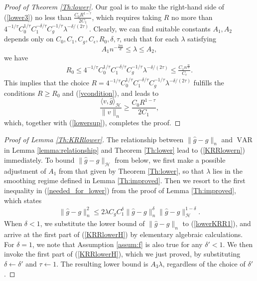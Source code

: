 \documentclass[12pt]{article}
\theoremstyle{plain}
\theoremstyle{remark}
\begin{document}
\begin{proof}[Proof of Theorem \ref{Th:lower}]
    Our goal is to make the right-hand side of (\ref{lower3}) no less than $\frac{C_0R^{1-\tau}}{2C_1}$, which requires taking $R$ no more than $4^{-1/\tau}C_0^{1/\tau}C_1^{-\delta/\tau}C_g^{-1/\tau}\lambda^{-\delta/(2\tau)}$. Clearly, we can find suitable constants $A_1,A_2$ depends only on $C_0,C_1,C_g,C_\epsilon,R_0,\delta,\tau$, such that for each $\lambda$ satisfying
    \[A_1 n^{-\frac{2m}{d}}\leq \lambda\leq A_2,\]
    we have
    \begin{eqnarray}\label{R0}
        R_0\leq 4^{-1/\tau}C_0^{1/\tau}C_1^{-\delta/\tau}C_g^{-1/\tau}\lambda^{-\delta/(2\tau)}\leq \frac{C_1n^{\frac{m}{d}}}{C_\epsilon}.
    \end{eqnarray}
    This implies that the choice $R=4^{-1/\tau}C_0^{1/\tau}C_1^{-\delta/\tau}C_g^{-1/\tau}\lambda^{-\delta/(2\tau)}$ fulfills the conditions $R\geq R_0$ and (\ref{vcondition}), and leads to
    \[\frac{\langle v,\hat{g}\rangle_\mathcal{H}}{\|v\|_n}\geq \frac{C_0 R^{1-\tau}}{2C_1},\]
    which, together with (\ref{lowersup}), completes the proof.
\end{proof}

 \begin{proof}[Proof of Lemma \ref{Th:KRRlower}]
        The relationship between $\|\hat{g}-g\|_n$ and $\operatorname{VAR}$ in Lemma \ref{lemma:relationship} and Theorem \ref{Th:lower} lead to (\ref{KRRlowern}) immediately. To bound $\|\hat{g}-g\|_\mathcal{H}$ from below, we first make a possible adjustment of $A_1$ from that given by Theorem \ref{Th:lower}, so that $\lambda$ lies in the smoothing regime defined in Lemma \ref{Th:improved}. Then we resort to the first inequality in (\ref{needed_for_lower}) from the proof of Lemma \ref{Th:improved}, which states
        \begin{eqnarray}\label{lowerKRR1}
            \|\hat{g}-g\|_n^2\leq 2 \lambda C_gC_1^\delta\|\hat{g}-g\|^{\delta}_n\|\hat{g}-g\|_{\mathcal{H}}^{1-\delta}.
        \end{eqnarray}
        When $\delta<1$, we substitute the lower bound of $\|\hat{g}-g\|_n$ to (\ref{lowerKRR1}), and arrive at the first part of (\ref{KRRlowerH})
        by elementary algebraic calculations. For $\delta=1$, we note that Assumption \ref{assum:f} is also true for any $\delta'<1$. We then invoke the first part of (\ref{KRRlowerH}), which we just proved, by substituting $\delta\leftarrow\delta'$ and $\tau\leftarrow 1$. The resulting lower bound is $A_3 \lambda$, regardless of the choice of $\delta'$.
    \end{proof}
\end{document}
